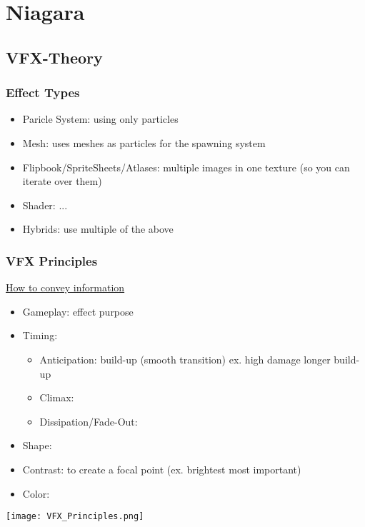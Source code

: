 \chapter{Niagara}
    \section{VFX-Theory}
        \subsection{Effect Types}
            \begin{itemize}
                \item Paricle System: using only particles 
                \item Mesh: uses meshes as particles for the spawning system
                \item Flipbook/SpriteSheets/Atlases: multiple images in one texture (so you can iterate over them)
                \item Shader: ...
                \item Hybrids: use multiple of the above
            \end{itemize}
        \subsection{VFX Principles}
            \underline{How to convey information}
            \begin{itemize}
                \item Gameplay: effect purpose
                \item Timing:
                \begin{itemize}
                    \item Anticipation: build-up (smooth transition) ex. high damage longer build-up
                    \item Climax:
                    \item Dissipation/Fade-Out:
                \end{itemize}
                \item Shape:
                \item Contrast: to create a focal point (ex. brightest most important)
                \item Color:
            \end{itemize}
            \texttt{[image: VFX\_Principles.png]}
